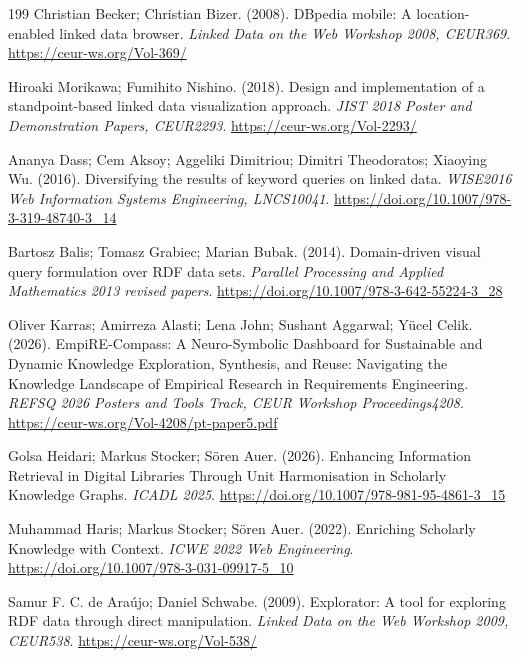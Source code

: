 \documentclass[manuscript,review,screen]{acmart}
\begin{document}
\begin{thebibliography}{199}
 Christian Becker; Christian Bizer. (2008). DBpedia mobile: A location-enabled linked data browser. \textit{Linked Data on the Web Workshop 2008, CEUR369}. \url{https://ceur-ws.org/Vol-369/}

 Hiroaki Morikawa; Fumihito Nishino. (2018). Design and implementation of a standpoint-based linked data visualization approach. \textit{JIST 2018 Poster and Demonstration Papers, CEUR2293}. \url{https://ceur-ws.org/Vol-2293/}

 Ananya Dass; Cem Aksoy; Aggeliki Dimitriou; Dimitri Theodoratos; Xiaoying Wu. (2016). Diversifying the results of keyword queries on linked data. \textit{WISE2016 Web Information Systems Engineering, LNCS10041}. \url{https://doi.org/10.1007/978-3-319-48740-3_14}

 Bartosz Balis; Tomasz Grabiec; Marian Bubak. (2014). Domain-driven visual query formulation over RDF data sets. \textit{Parallel Processing and Applied Mathematics 2013 revised papers}. \url{https://doi.org/10.1007/978-3-642-55224-3_28}

 Oliver Karras; Amirreza Alasti; Lena John; Sushant Aggarwal; Y\"{u}cel Celik. (2026). EmpiRE-Compass: A Neuro-Symbolic Dashboard for Sustainable and Dynamic Knowledge Exploration, Synthesis, and Reuse: Navigating the Knowledge Landscape of Empirical Research in Requirements Engineering. \textit{REFSQ 2026 Posters and Tools Track, CEUR Workshop Proceedings4208}. \url{https://ceur-ws.org/Vol-4208/pt-paper5.pdf}

 Golsa Heidari; Markus Stocker; S\"{o}ren Auer. (2026). Enhancing Information Retrieval in Digital Libraries Through Unit Harmonisation in Scholarly Knowledge Graphs. \textit{ICADL 2025}. \url{https://doi.org/10.1007/978-981-95-4861-3_15}

 Muhammad Haris; Markus Stocker; S\"{o}ren Auer. (2022). Enriching Scholarly Knowledge with Context. \textit{ICWE 2022 Web Engineering}. \url{https://doi.org/10.1007/978-3-031-09917-5_10}

 Samur F. C. de Ara\'{u}jo; Daniel Schwabe. (2009). Explorator: A tool for exploring RDF data through direct manipulation. \textit{Linked Data on the Web Workshop 2009, CEUR538}. \url{https://ceur-ws.org/Vol-538/}


\end{thebibliography}
\end{document}
